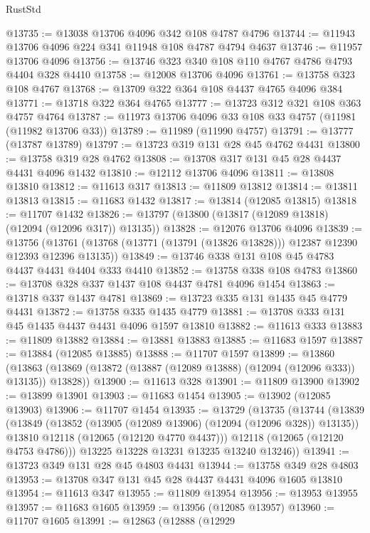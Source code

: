 \begin{lexlean}{RustStd}
\begin{coremodule}
@13735 := @13038 @13706 @4096 @342 @108 @4787 @4796
@13744 := @11943 @13706 @4096 @224 @341 @11948 @108 @4787 @4794 @4637
@13746 := @11957 @13706 @4096
@13756 := @13746 @323 @340 @108 @110 @4767 @4786 @4793 @4404 @328 @4410
@13758 := @12008 @13706 @4096
@13761 := @13758 @323 @108 @4767
@13768 := @13709 @322 @364 @108 @4437 @4765 @4096 @384
@13771 := @13718 @322 @364 @4765
@13777 := @13723 @312 @321 @108 @363 @4757 @4764
@13787 := @11973 @13706 @4096 @33 @108 @33 @4757 (@11981 (@11982 @13706 @33))
@13789 := @11989 (@11990 @4757)
@13791 := @13777 (@13787 @13789)
@13797 := @13723 @319 @131 @28 @45 @4762 @4431
@13800 := @13758 @319 @28 @4762
@13808 := @13708 @317 @131 @45 @28 @4437 @4431 @4096 @1432
@13810 := @12112 @13706 @4096
@13811 := @13808 @13810
@13812 := @11613 @317
@13813 := @11809 @13812
@13814 := @13811 @13813
@13815 := @11683 @1432
@13817 := @13814 (@12085 @13815)
@13818 := @11707 @1432
@13826 := @13797 (@13800 (@13817 (@12089 @13818) (@12094 (@12096 @317)) @13135))
@13828 := @12076 @13706 @4096
@13839 := @13756
    (@13761 (@13768 (@13771 (@13791 (@13826 @13828))) @12387 @12390 @12393 @12396 @13135))
@13849 := @13746 @338 @131 @108 @45 @4783 @4437 @4431 @4404 @333 @4410
@13852 := @13758 @338 @108 @4783
@13860 := @13708 @328 @337 @1437 @108 @4437 @4781 @4096 @1454
@13863 := @13718 @337 @1437 @4781
@13869 := @13723 @335 @131 @1435 @45 @4779 @4431
@13872 := @13758 @335 @1435 @4779
@13881 := @13708 @333 @131 @45 @1435 @4437 @4431 @4096 @1597 @13810
@13882 := @11613 @333
@13883 := @11809 @13882
@13884 := @13881 @13883
@13885 := @11683 @1597
@13887 := @13884 (@12085 @13885)
@13888 := @11707 @1597
@13899 := @13860
    (@13863 (@13869 (@13872 (@13887 (@12089 @13888) (@12094 (@12096 @333)) @13135)) @13828))
@13900 := @11613 @328
@13901 := @11809 @13900
@13902 := @13899 @13901
@13903 := @11683 @1454
@13905 := @13902 (@12085 @13903)
@13906 := @11707 @1454
@13935 := @13729
    (@13735
      (@13744
        (@13839
          (@13849
            (@13852 (@13905 (@12089 @13906) (@12094 (@12096 @328)) @13135))
            @13810
            @12118
            (@12065 (@12120 @4770 @4437)))
          @12118
          (@12065 (@12120 @4753 @4786)))
        @13225
        @13228
        @13231
        @13235
        @13240
        @13246))
@13941 := @13723 @349 @131 @28 @45 @4803 @4431
@13944 := @13758 @349 @28 @4803
@13953 := @13708 @347 @131 @45 @28 @4437 @4431 @4096 @1605 @13810
@13954 := @11613 @347
@13955 := @11809 @13954
@13956 := @13953 @13955
@13957 := @11683 @1605
@13959 := @13956 (@12085 @13957)
@13960 := @11707 @1605
@13991 := @12863
    (@12888
      (@12929

\end{coremodule}
\end{lexlean}
